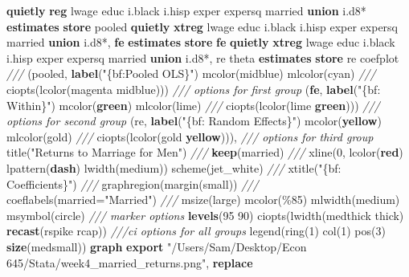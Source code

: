 \documentclass[
]{book}
\newenvironment{Shaded}{\begin{snugshade}}{\end{snugshade}}
\newcommand{\BaseNTok}[1]{\textcolor[rgb]{0.00,0.00,0.81}{#1}}
\newcommand{\CommentTok}[1]{\textcolor[rgb]{0.56,0.35,0.01}{\textit{#1}}}
\newcommand{\DecValTok}[1]{\textcolor[rgb]{0.00,0.00,0.81}{#1}}
\newcommand{\KeywordTok}[1]{\textcolor[rgb]{0.13,0.29,0.53}{\textbf{#1}}}
\newcommand{\NormalTok}[1]{#1}
\newcommand{\StringTok}[1]{\textcolor[rgb]{0.31,0.60,0.02}{#1}}
\begin{document}
\begin{Shaded}
\begin{Highlighting}[]
\KeywordTok{quietly} \KeywordTok{reg}\NormalTok{ lwage educ i.}\BaseNTok{black}\NormalTok{ i.hisp exper expersq married }\KeywordTok{union}\NormalTok{ i.d8*}
\KeywordTok{estimates} \KeywordTok{store}\NormalTok{ pooled}
\KeywordTok{quietly} \KeywordTok{xtreg}\NormalTok{ lwage educ i.}\BaseNTok{black}\NormalTok{ i.hisp exper expersq married }\KeywordTok{union}\NormalTok{ i.d8*, }\KeywordTok{fe}
\KeywordTok{estimates} \KeywordTok{store} \KeywordTok{fe}
\KeywordTok{quietly} \KeywordTok{xtreg}\NormalTok{ lwage educ i.}\BaseNTok{black}\NormalTok{ i.hisp exper expersq married }\KeywordTok{union}\NormalTok{ i.d8*, re theta}
\KeywordTok{estimates} \KeywordTok{store}\NormalTok{ re}
\NormalTok{coefplot }\CommentTok{///}
\NormalTok{    (pooled, }\KeywordTok{label}\NormalTok{(}\StringTok{"\{bf:Pooled OLS\}"}\NormalTok{) mcolor(}\BaseNTok{midblue}\NormalTok{) mlcolor(}\BaseNTok{cyan}\NormalTok{) }\CommentTok{///}
\NormalTok{      ciopts(lcolor(}\BaseNTok{magenta} \BaseNTok{midblue}\NormalTok{))) }\CommentTok{/// options for first group}
\NormalTok{    (}\KeywordTok{fe}\NormalTok{, }\KeywordTok{label}\NormalTok{(}\StringTok{"\{bf: Within\}"}\NormalTok{) mcolor(}\KeywordTok{green}\NormalTok{) mlcolor(}\BaseNTok{lime}\NormalTok{) }\CommentTok{///}
\NormalTok{      ciopts(lcolor(}\BaseNTok{lime} \KeywordTok{green}\NormalTok{))) }\CommentTok{/// options for second group}
\NormalTok{    (re, }\KeywordTok{label}\NormalTok{(}\StringTok{"\{bf: Random Effects\}"}\NormalTok{) mcolor(}\KeywordTok{yellow}\NormalTok{) mlcolor(}\BaseNTok{gold}\NormalTok{) }\CommentTok{///}
\NormalTok{      ciopts(lcolor(}\BaseNTok{gold} \KeywordTok{yellow}\NormalTok{))), }\CommentTok{/// options for third group}
      \BaseNTok{title}\NormalTok{(}\StringTok{"Returns to Marriage for Men"}\NormalTok{) }\CommentTok{///}
      \KeywordTok{keep}\NormalTok{(married) }\CommentTok{///}
      \BaseNTok{xline}\NormalTok{(0, lcolor(}\KeywordTok{red}\NormalTok{) lpattern(}\KeywordTok{dash}\NormalTok{) lwidth(medium)) }\DecValTok{scheme}\NormalTok{(jet\_white) }\CommentTok{///}
      \BaseNTok{xtitle}\NormalTok{(}\StringTok{"\{bf: Coefficients\}"}\NormalTok{) }\CommentTok{///}
\NormalTok{      graphregion(}\BaseNTok{margin}\NormalTok{(small)) }\CommentTok{///}
\NormalTok{      coeflabels(married=}\StringTok{"Married"}\NormalTok{) }\CommentTok{///}
\NormalTok{      msize(large) mcolor(\%85) mlwidth(medium) }\BaseNTok{msymbol}\NormalTok{(}\BaseNTok{circle}\NormalTok{) }\CommentTok{/// marker options}
      \KeywordTok{levels}\NormalTok{(95 90) ciopts(lwidth(}\BaseNTok{medthick}\NormalTok{ thick) }\KeywordTok{recast}\NormalTok{(rspike rcap)) }\CommentTok{///ci options for all groups}
      \BaseNTok{legend}\NormalTok{(}\BaseNTok{ring}\NormalTok{(1) col(1) pos(3) }\KeywordTok{size}\NormalTok{(medsmall))}
    \KeywordTok{graph} \KeywordTok{export} \StringTok{"/Users/Sam/Desktop/Econ 645/Stata/week4\_married\_returns.png"}\NormalTok{, }\KeywordTok{replace}
\end{Highlighting}
\end{Shaded}
\end{document}
